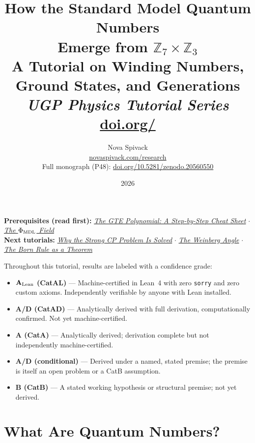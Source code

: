\documentclass[11pt,a4paper]{article}
\title{\textbf{How the Standard Model Quantum Numbers\\[4pt]
Emerge from $\mathbb{Z}_7 \times \mathbb{Z}_3$}\\[8pt]
\large A Tutorial on Winding Numbers, Ground States, and Generations\\[4pt]\normalsize\textit{UGP Physics Tutorial Series}
\\[2pt]\small\href{https://doi.org/\TutorialDOI}{doi.org/\TutorialDOI}}
\author{Nova Spivack\\[4pt]
\normalsize
\href{https://novaspivack.com/research}{novaspivack.com/research}\\[2pt]
\small Full monograph (P48):
\href{https://doi.org/10.5281/zenodo.20560550}{doi.org/10.5281/zenodo.20560550}
}
\date{2026}
\begin{document}
\setcounter{tocdepth}{2}
\maketitle
\tableofcontents
\newpage

\begin{tcolorbox}[colback=blue!6,colframe=blue!40!black,
  title=\textbf{UGP Physics Tutorial Series}]
\textbf{Prerequisites (read first):} \href{https://doi.org/10.5281/zenodo.20657889}{\emph{The GTE Polynomial: A Step-by-Step Cheat Sheet}} $\cdot$ \href{https://doi.org/10.5281/zenodo.20657885}{\emph{The $\Phi_{\rm MDL}$ Field}}\\[4pt]
\textbf{Next tutorials:} \href{https://doi.org/10.5281/zenodo.20657902}{\emph{Why the Strong CP Problem Is Solved}} $\cdot$ \href{https://doi.org/10.5281/zenodo.20657923}{\emph{The Weinberg Angle}} $\cdot$ \href{https://doi.org/10.5281/zenodo.20657861}{\emph{The Born Rule as a Theorem}}\\[4pt]
\end{tcolorbox}

\begin{tcolorbox}[colback=boxgreen,colframe=green!50!black,
  title=\textbf{Claim-Strength Taxonomy}]
Throughout this tutorial, results are labeled with a confidence grade:
\begin{itemize}[itemsep=2pt]
  \item \textbf{$\mathbf{A}_{\rm Lean}$ (CatAL)} --- Machine-certified in Lean~4 with zero \texttt{sorry} and zero custom axioms.  Independently verifiable by anyone with Lean installed.
  \item \textbf{A/D (CatAD)} --- Analytically derived with full derivation, computationally confirmed.  Not yet machine-certified.
  \item \textbf{A (CatA)} --- Analytically derived; derivation complete but not independently machine-certified.
  \item \textbf{A/D (conditional)} --- Derived under a named, stated premise; the premise is itself an open problem or a CatB assumption.
  \item \textbf{B (CatB)} --- A stated working hypothesis or structural premise; not yet derived.
\end{itemize}
\end{tcolorbox}


\section{What Are Quantum Numbers?}
\label{sec:qn}
\end{document}
